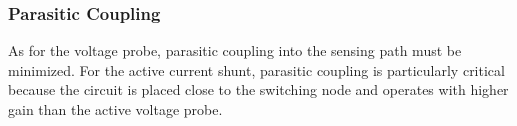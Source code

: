 \subsubsection*{Parasitic Coupling}
As for the voltage probe, parasitic coupling into the sensing path must be minimized.
For the active current shunt, parasitic coupling is particularly critical because the circuit is placed close to the switching node and operates with higher gain than the active voltage probe.

